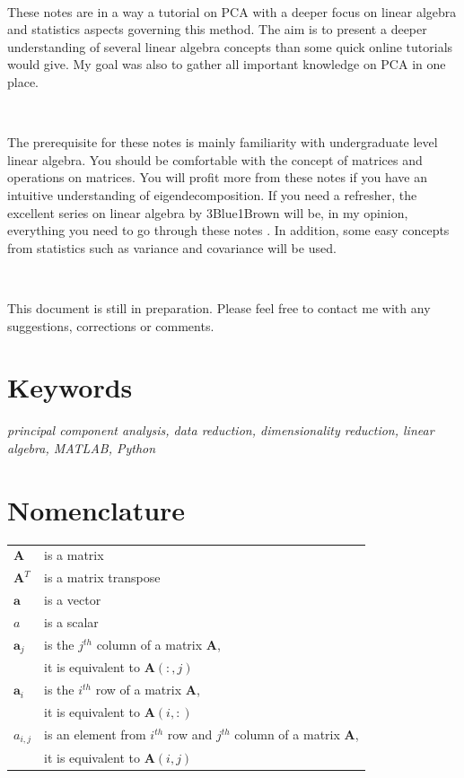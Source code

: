 \documentclass[10pt,twocolumn]{article}
\begin{document}
\,\,

These notes are in a way a tutorial on PCA with a deeper focus on linear algebra and statistics aspects governing this method. The aim is to present a deeper understanding of several linear algebra concepts than some quick online tutorials would give. My goal was also to gather all important knowledge on PCA in one place. 

\,\,

The prerequisite for these notes is mainly familiarity with undergraduate level linear algebra. You should be comfortable with the concept of matrices and operations on matrices. You will profit more from these notes if you have an intuitive understanding of eigendecomposition. If you need a refresher, the excellent series on linear algebra by 3Blue1Brown will be, in my opinion, everything you need to go through these notes \cite{3Blue1Brown}. In addition, some easy concepts from statistics such as variance and covariance will be used.

\,\,

This document is still in preparation. Please feel free to contact me with any suggestions, corrections or comments.

\section*{Keywords}

\textit{principal component analysis, data reduction, dimensionality reduction, linear algebra, MATLAB\textregistered, Python}

\tableofcontents

\section*{Nomenclature}

\begin{tabular}{ll}
    $\bm{A}$ & is a matrix \\
     $\bm{A}^T$ & is a matrix transpose \\
     $\bm{a}$ & is a vector \\
     $a$ & is a scalar \\
    $\bm{a}_j$ & is the $j^{th}$ column of a matrix $\bm{A}$, \\
    & it is equivalent to  $\bm{A}(:,j)$ \\
    $\bm{a}_i$ & is the $i^{th}$ row of a matrix $\bm{A}$, \\
    & it is equivalent to  $\bm{A}(i,:)$ \\
    $a_{i,j}$ & is an element from $i^{th}$ row and $j^{th}$ column of a matrix $\bm{A}$, \\ 
    & it is equivalent to  $\bm{A}(i,j)$ \\
\end{tabular}
\end{document}
